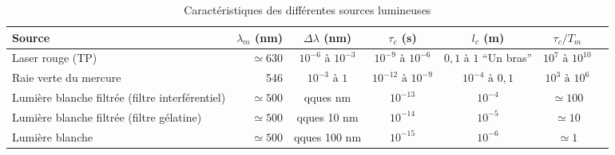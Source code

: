 \documentclass[10pt,a4paper]{article}
\begin{document}
\begin{table}[h]
    \centering
    \renewcommand{\arraystretch}{1.3} %
    \setlength{\tabcolsep}{10pt} %
    \caption{Caractéristiques des différentes sources lumineuses}
    \begin{tabularx}{\linewidth}{@{} X r c c c c X @{}}
        \hline
        \textbf{Source} & \(\lambda_m\) (nm) & \(\Delta\lambda\) (nm) & \(\tau_c\) (s) & \(l_c\) (m) & \(\tau_c / T_m\) \\
        \hline
        Laser rouge (TP) & \(\simeq 630\) & \(10^{-6} \text{ à } 10^{-3}\) & \(10^{-9} \text{ à } 10^{-6}\) & \(0,1 \text{ à } 1\) ``Un bras'' & \(10^7 \text{ à } 10^{10}\) \\
        \hline
        Raie verte du mercure & 546 & \(10^{-3} \text{ à } 1\) & \(10^{-12} \text{ à } 10^{-9}\) & \(10^{-4} \text{ à } 0,1\) & \(10^3 \text{ à } 10^6\) \\
        \hline
        Lumière blanche filtrée (filtre interférentiel) & \(\simeq 500\) & qques nm & \(10^{-13}\) & \(10^{-4}\) & \(\simeq 100\) \\
        \hline
        Lumière blanche filtrée (filtre gélatine) & \(\simeq 500\) & qques 10 nm & \(10^{-14}\) & \(10^{-5}\) & \(\simeq 10\) \\
        \hline
        Lumière blanche & \(\simeq 500\) & qques 100 nm & \(10^{-15}\) & \(10^{-6}\) & \(\simeq 1\) \\
        \hline
    \end{tabularx}
    \label{tab:source_lumineuse}
\end{table}
\end{document}
